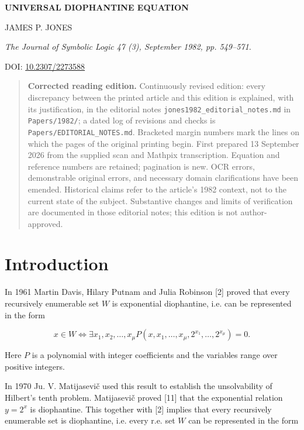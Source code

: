 \documentclass[11pt,a4paper]{article}
\newcommand{\origpage}[1]{\marginnote{\footnotesize\textbf{[#1]}}}
\begin{document}
\begin{center}
{\Large\bfseries UNIVERSAL DIOPHANTINE EQUATION}\par\medskip
{\large JAMES P. JONES}\par\smallskip
{\small\itshape The Journal of Symbolic Logic 47 (3), September 1982, pp. 549--571.}\par
{\small DOI: \href{https://doi.org/10.2307/2273588}{10.2307/2273588}}
\end{center}
\begin{quote}\small
\textbf{Corrected reading edition.} Continuously revised edition: every discrepancy between the printed article and this edition is explained, with its justification, in the editorial notes \texttt{jones1982\_editorial\_notes.md} in \texttt{Papers/1982/}; a dated log of revisions and checks is \texttt{Papers/}\allowbreak\texttt{EDITORIAL\_NOTES.md}. Bracketed margin numbers mark the lines on which the pages of the original printing begin. First prepared 13 September 2026 from the supplied
scan and Mathpix transcription. Equation and reference numbers are retained;
pagination is new. OCR errors, demonstrable original errors, and necessary
domain clarifications have been emended. Historical claims refer to the
article's 1982 context, not to the current state of the subject. Substantive
changes and limits of verification are documented in those
editorial notes; this edition is not author-approved.
\end{quote}
\section{Introduction} \origpage{549}In 1961 Martin Davis, Hilary Putnam and Julia Robinson [2] proved that every recursively enumerable set $W$ is exponential diophantine, i.e. can be represented in the form

\[
x \in W \Leftrightarrow \exists x_{1}, x_{2}, \ldots, x_{\mu} P\left(x, x_{1}, \ldots, x_{\mu}, 2^{x_{1}}, \ldots, 2^{x_{\mu}}\right)=0 .
\]

Here $P$ is a polynomial with integer coefficients and the variables range over positive integers.

In 1970 Ju. V. Matijasevič used this result to establish the unsolvability of Hilbert's tenth problem. Matijasevič proved [11] that the exponential relation $y=2^{x}$ is diophantine. This together with [2] implies that every recursively enumerable set is diophantine, i.e. every r.e. set $W$ can be represented in the form
\end{document}
